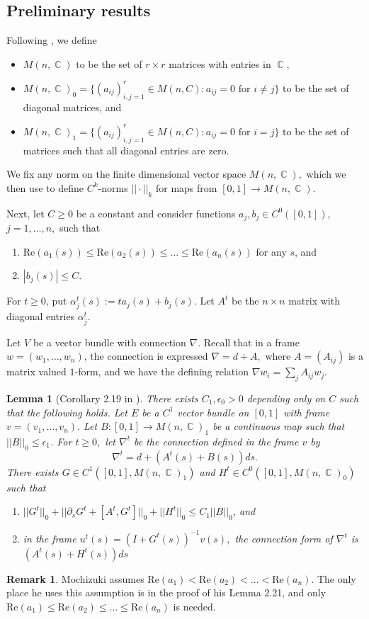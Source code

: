 \documentclass[10pt]{amsart}
\newtheorem{lem}[thm]{Lemma}
\theoremstyle{definition}
\newtheorem{remark}[thm]{Remark}
\DeclareMathOperator{\C}{\mathbb{C}}
\begin{document}
\subsection{Preliminary results}
Following \cite[section 2.4]{Mo}, we define
\begin{itemize}
    \item $M(n,\C)$ to be the set of $r\times r$ matrices with entries in $\C$,
    \item $M(n,\C)_0=\{(a_{ij})_{i,j=1}^r\in M(n,C): a_{ij}=0 \textrm{ for }i\neq j\}$ to be the set of diagonal matrices, and 
    \item $M(n,\C)_1=\{(a_{ij})_{i,j=1}^r\in M(n,C): a_{ij}=0 \textrm{ for }i=j\}$ to be the set of matrices such that all diagonal entries are zero.
\end{itemize}
We fix any norm on the finite dimensional vector space $M(n,\C),$ which we then use to define $C^{k}$-norms $||\cdot ||_k$ for maps from $[0,1]\to M(n,\C)$. 

Next, let $C\geq 0$ be a constant and consider functions $a_j,b_j\in C^0([0,1])$, $j=1,\dots, n,$ such that 
\begin{enumerate}
    \item $\textrm{Re}(a_1(s))\leq \textrm{Re}(a_2(s))\leq\dots \leq \textrm{Re}(a_n(s))$ for any $s$, and
    \item $|b_j(s)|\leq C.$
\end{enumerate}
For $t\geq 0$, put $\alpha_j^t(s):=ta_j(s)+b_j(s)$. Let $A^t$ be the $n\times n$ matrix with diagonal entries $\alpha_j^t.$ 

Let $V$ be a vector bundle with connection $\nabla$. Recall that in a frame $w=(w_1,\dots,w_n)$, the connection is expressed $\nabla=d+A,$ where $A=(A_{ij})$ is a matrix valued $1$-form, and we have the defining relation $\nabla w_i=\sum_jA_{ij}w_j.$
\begin{lem}[Corollary 2.19 in \cite{Mo}]\label{cor2.19}
    There exists $C_1,\epsilon_0>0$ depending only on $C$ such that the following holds. Let $E$ be a $C^1$ vector bundle on $[0,1]$ with frame $v=(v_1,\dots, v_n).$ Let $B:[0,1]\to M(n,\C)_1$ be a continuous map such that $||B||_0\leq \epsilon_1$. For $t\geq 0,$ let $\nabla^t$ be the connection defined in the frame $v$ by $$\nabla^t = d+(A^t(s)+B(s))ds.$$ There exists $G\in C^1([0,1],M(n,\C)_1)$ and $H^t\in C^0([0,1],M(n,\C)_0)$ such that
    \begin{enumerate}
        \item $||G^t||_0+||\partial_s G^t+[A^t,G^t]||_0+||H^t||_0\leq C_1||B||_0$, and
        \item in the frame $u^t(s)=(I+G^t(s))^{-1}v(s),$ the connection form of $\nabla^t$ is $(A^t(s)+H^t(s))ds$
    \end{enumerate}
\end{lem}
\begin{remark}
    Mochizuki assumes $\textrm{Re}(a_1)<\textrm{Re}(a_2)<\dots < \textrm{Re}(a_n).$ The only place he uses this assumption is in the proof of his Lemma 2.21, and only $\textrm{Re}(a_1)\leq\textrm{Re}(a_2)\leq\dots \leq \textrm{Re}(a_n)$ is needed.
\end{remark}
\end{document}

